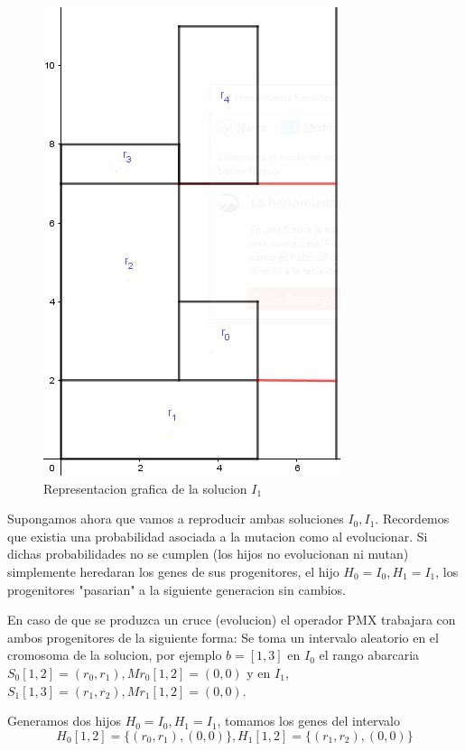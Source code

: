 \documentclass[10pt]{article}
\begin{document}
\begin{figure}[H]
\centerline{\includegraphics[width=0.7\linewidth]{grafica_ejemplo_solucion2_GA.jpg}}
\caption{Representacion grafica de la solucion $I_1$}
\label{fig_2}
\end{figure}

Supongamos ahora que vamos a reproducir ambas soluciones $I_0,I_1$. Recordemos que existia una probabilidad asociada a la mutacion como al evolucionar. Si dichas probabilidades no se cumplen (los hijos no evolucionan ni mutan) simplemente heredaran los genes de sus progenitores, el hijo $H_0 = I_0, H_1 = I_1$, los progenitores "pasarian" a la siguiente generacion sin cambios.

En caso de que se produzca un cruce (evolucion) el operador PMX trabajara con ambos progenitores de la siguiente forma: 
Se toma un intervalo aleatorio en el cromosoma de la solucion, por ejemplo $b = [1,3]$ en $I_0$ el rango abarcaria $S_0[1,2] = (r_0,r_1), Mr_0[1,2] = (0,0)$ y en $I_1$, $S_1[1,3] = (r_1,r_2), Mr_1[1,2] = (0,0)$.

Generamos dos hijos $H_0 = I_0, H_1 = I_1$, tomamos los genes del intervalo
$$H_0[1,2] = \{(r_0,r_1),(0,0)\}, H_1[1,2] = \{(r_1,r_2),(0,0)\}$$
\end{document}
